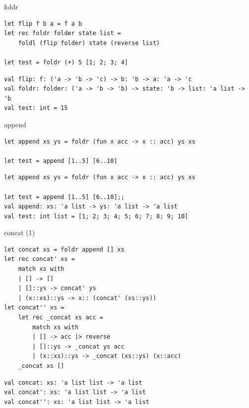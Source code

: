 \documentclass[t]{beamer}
\begin{document}
\begin{frame}[label={sec:org0765767},fragile]{foldr}
 \begin{verbatim}
let flip f b a = f a b 
let rec foldr folder state list = 
    foldl (flip folder) state (reverse list)

let test = foldr (+) 5 [1; 2; 3; 4]
\end{verbatim}

\begin{verbatim}
val flip: f: ('a -> 'b -> 'c) -> b: 'b -> a: 'a -> 'c
val foldr: folder: ('a -> 'b -> 'b) -> state: 'b -> list: 'a list -> 'b
val test: int = 15
\end{verbatim}
\end{frame}

\begin{frame}[label={sec:org086af7e},fragile]{append}
 \begin{verbatim}
let append xs ys = foldr (fun x acc -> x :: acc) ys xs

let test = append [1..5] [6..10] 
\end{verbatim}

\begin{verbatim}
let append xs ys = foldr (fun x acc -> x :: acc) ys xs

let test = append [1..5] [6..10];;
val append: xs: 'a list -> ys: 'a list -> 'a list
val test: int list = [1; 2; 3; 4; 5; 6; 7; 8; 9; 10]
\end{verbatim}
\end{frame}

\begin{frame}[label={sec:orgbbd6af4},fragile]{concat (1)}
 \begin{verbatim}
let concat xs = foldr append [] xs
let rec concat' xs = 
    match xs with
    | [] -> []
    | []::ys -> concat' ys
    | (x::xs)::ys -> x:: (concat' (xs::ys))
let concat'' xs =
    let rec _concat xs acc = 
        match xs with
        | [] -> acc |> reverse
        | []::ys -> _concat ys acc
        | (x::xs)::ys -> _concat (xs::ys) (x::acc)
    _concat xs []
\end{verbatim}

\begin{verbatim}
val concat: xs: 'a list list -> 'a list
val concat': xs: 'a list list -> 'a list
val concat'': xs: 'a list list -> 'a list
\end{verbatim}
\end{frame}
\end{document}
